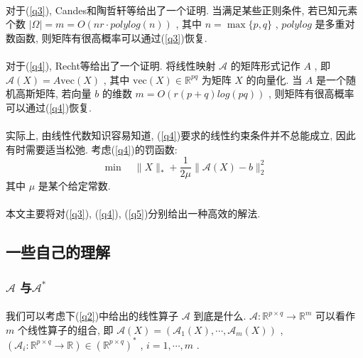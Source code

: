 \documentclass[a4paper, UTF8]{ctexart}				%
\numberwithin{equation}{section}				%
\newcommand{\upcite}[1]{\textsuperscript{\textsuperscript{\cite{#1}}}}
\begin{document}
			\paragraph{}
				\quad 对于(\ref{q3}), Candes和陶哲轩等给出了一个证明. 当满足某些正则条件, 若已知元素个数 $\lvert{\Omega}\rvert = m = O(nr \cdot polylog(n))$ , 其中 $n = \max \{p,q\}$ , $polylog$ 是多重对数函数, 则矩阵有很高概率可以通过(\ref{q3})恢复.\upcite{candes2010power}

			\paragraph{}
				\quad 对于(\ref{q4}), Recht等给出了一个证明. 将线性映射 $\mathcal{A}$ 的矩阵形式记作 $A$ , 即 $\mathcal{A}(X) = A\text{vec}(X)$ , 其中 $\text{vec}(X) \in \mathbb{R}^{pq}$ 为矩阵 $X$ 的向量化. 当 $A$ 是一个随机高斯矩阵, 若向量 $b$ 的维数 $m = O(r(p + q)log(pq))$ , 则矩阵有很高概率可以通过(\ref{q4})恢复.\upcite{recht2010guaranteed}

			\paragraph{}
				\quad 实际上, 由线性代数知识容易知道, (\ref{q4})要求的线性约束条件并不总能成立, 因此有时需要适当松弛. 考虑(\ref{q4})的罚函数:
				\begin{equation}\label{q5}
					\min \quad \lVert{X}\rVert_*+ \frac{1}{2\mu} \lVert{\mathcal{A}(X) - b}\rVert_2^2
				\end{equation}
				其中 $\mu$ 是某个给定常数.

			\paragraph{}
				\quad 本文主要将对(\ref{q3}), (\ref{q4}), (\ref{q5})分别给出一种高效的解法.
		\subsection{一些自己的理解}
			\subsubsection{$\mathcal{A}$ 与$\mathcal{A}^*$}
				\paragraph{}
					\quad 我们可以考虑下(\ref{q2})中给出的线性算子 $\mathcal{A}$ 到底是什么.
					$\mathcal{A}: \mathbb{R}^{p \times q} \rightarrow \mathbb{R}^{m}$ 可以看作 $m$ 个线性算子的组合, 即 $\mathcal{A}(X) = (\mathcal{A}_1(X), \cdots, \mathcal{A}_m(X))$ , $(\mathcal{A}_i : \mathbb{R}^{p \times q} \rightarrow \mathbb{R}) \in {(\mathbb{R}^{p \times q})}^*$ , $i = 1, \cdots, m$ .
\end{document}
